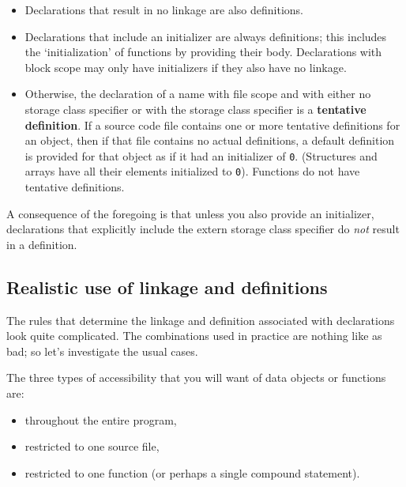    \begin{itemize}
    \item Declarations that result in no linkage are also definitions.

    \item Declarations that include an initializer are always definitions;
     this includes the `initialization' of functions by providing their
     body. Declarations with block scope may only have initializers if
     they also have no linkage.

    \item Otherwise, the declaration of a name with file scope and with
     either no storage class specifier or with the \static{}
     storage class specifier is a \textbf{tentative definition}. If
     a source code file contains one or more tentative definitions for
     an object, then if that file contains no actual definitions, a
     default definition is provided for that object as if it had an
     initializer of \texttt{0}. (Structures and arrays have
     all their elements initialized to \texttt{0}). Functions
     do not have tentative definitions.
   \end{itemize}

   A consequence of the foregoing is that unless you also provide an
    initializer, declarations that explicitly include the extern storage
    class specifier do \textit{not} result in a definition.


  

  \subsection{Realistic use of linkage and definitions}
   

   The rules that determine the linkage and definition associated with
    declarations look quite complicated. The combinations used in practice
    are nothing like as bad; so let's investigate the usual cases.


   The three types of accessibility that you will want of data objects or
    functions are:


   \begin{itemize}
    \item throughout the entire program,

    \item restricted to one source file,

    \item restricted to one function (or perhaps a single compound
     statement).
   \end{itemize}

